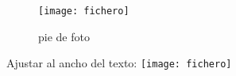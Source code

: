 


\usepackage{graphicx}

\begin{figure}
  \centering
    \texttt{[image: fichero]}
  \caption{pie de foto}
  \label{fig:nombreParaReferirnos}
\end{figure}

Ajustar al ancho del texto:
\texttt{[image: fichero]}


